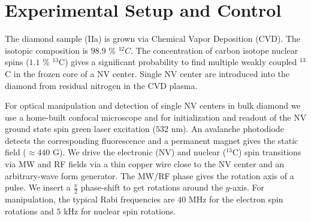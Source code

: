 \documentclass[aps,floatfix,footinbib,superscriptaddress]{revtex4-1}
\begin{document}
\author{T. Unden}

\author{D. Louzon}

\author{M. Zwolak}

\author{W. H. Zurek}

\author{F. Jelezko}

\maketitle

\renewcommand\thefigure{S\arabic{figure}}

\section{Experimental Setup and Control}

The diamond sample (IIa) is grown via Chemical Vapor Deposition (CVD). The isotopic composition is $98.9$ \% $^{12}C$. The concentration of carbon isotope nuclear spins ($1.1$ \% $^{13}$C) gives a significant probability to find multiple weakly coupled $^{13}$C in the frozen core of a NV center. Single NV center are introduced into the diamond from residual nitrogen in the CVD plasma.

For optical manipulation and detection of single NV centers in bulk diamond we use a home-built confocal microscope and for initialization and readout of the NV ground state spin green laser excitation ($532$ nm). An avalanche photodiode detects the corresponding fluorescence and a permanent magnet gives the static field ($\approx440$ G). We drive the electronic (NV) and nuclear ($^{13}$C) spin transitions via MW and RF fields via a thin copper wire close to the NV center and an arbitrary-wave form generator. The MW/RF phase gives the rotation axis of a pulse. We insert a $\frac{\pi}{2}$ phase-shift to get rotations around the $y$-axis. For manipulation, the typical Rabi frequencies are $40$ MHz for the electron spin rotations and $5$ kHz for nuclear spin rotations.
\end{document}
